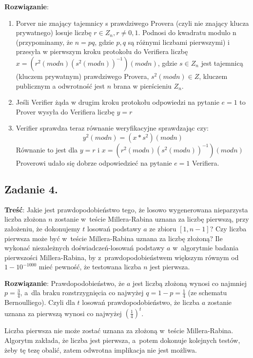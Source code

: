 \documentclass[a4paper,10pt, twocolumn]{article}
\begin{document}
\textbf{Rozwiązanie}: 
\begin{enumerate}
 \item Porver nie znający tajemnicy s prawdziwego Provera (czyli nie znający klucza prywatnego) losuje liczbę $r\in Z_n, r\neq 0,1$. Podnosi do kwadratu modulo n (przypominamy, że $n=pq$, gdzie $p,q$ są różnymi liczbami pierwszymi) i przesyła w pierwszym kroku protokołu do Verifiera liczbę $x=(r^2(modn){(s^2(modn))}^{-1})(modn)$, gdzie $s \in Z_n$ jest tajemnicą (kluczem prywatnym) prawdziwego Provera, $s^2(modn)\in Z$, kluczem publicznym a odwrotność jest $n$ brana w pierścieniu $Z_n$.
 \item Jeśli Verifier żąda w drugim kroku protokołu odpowiedzi na pytanie $e=1$ to Prover wysyła do Verifiera liczbę $y=r$
 \item Verifier sprawdza teraz równanie weryfikacyjne sprawdzając czy:
  \begin{equation*}
   y^2(modn)=(x*s^2)(modn)
  \end{equation*}
  Równanie to jest dla $y=r$ i $x=(r^2(modn){(s^2(modn))}^{-1})(modn)$
  Proverowi udało się dobrze odpowiedzieć na pytanie $e=1$ Verifiera.
\end{enumerate}

\subsection{Zadanie 4.}

\textbf{Treść}: Jakie jest prawdopodobieństwo tego, że losowo wygenerowana nieparzysta liczba złożona $n$ zostanie w~teście Millera-Rabina uznana za liczbę pierwszą, przy założeniu, że dokonujemy $t$ losowań podstawy $a$ ze zbioru $[1, n-1]$? Czy liczba pierwsza może być w~teście Millera-Rabina uznana za liczbę złożoną? Ile wykonać niezależnych doświadczeń-losowań podstawy $a$ w~algorytmie badania pierwszości Millera-Rabina, by z~prawdopodobieństwem większym równym od $1 - 10^{-1000}$ mieć pewność, że testowana liczba $n$ jest pierwsza.

\textbf{Rozwiązanie}: Prawdopodobieństwo, że $a$ jest liczbą złożoną wynosi co najmniej $p = \frac{3}{4}$, a~dla braku rozstrzygnięcia co najwyżej $q = 1 - p = \frac{1}{4}$ (ze schematu Bernoulliego). Czyli dla $t$ losowań prawdopodobieństwo, że liczba $a$ zostanie uznana za pierwszą wynosi co najwyżej $(\frac{1}{4})^{t}$.

\noindent Liczba pierwsza nie może zostać uznana za złożoną w~teście Millera-Rabina. Algorytm zakłada, że liczba jest pierwsza, a~potem dokonuje kolejnych testów, żeby tę tezę obalić, zatem odwrotna implikacja nie jest możliwa. 
\end{document}
